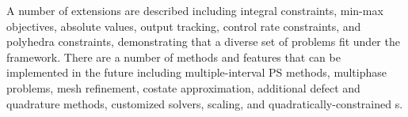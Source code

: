 A number of extensions are described including integral constraints, min-max objectives, absolute values, output tracking, control rate constraints, and polyhedra constraints, demonstrating that a diverse set of problems fit under the \lqdo{} framework.
There are a number of methods and features that can be implemented in the future including multiple-interval PS methods, multiphase problems, mesh refinement, costate approximation, additional defect and quadrature methods, customized \qp{} solvers, scaling, and quadratically-constrained {\qp}s.